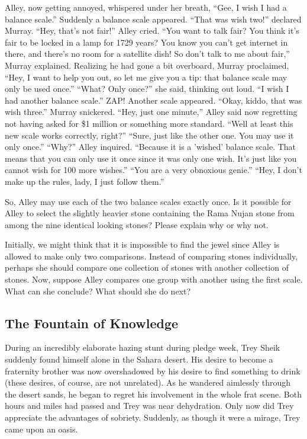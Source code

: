 Alley, now getting annoyed, whispered under her breath, ``Gee, I wish I had a balance scale.'' Suddenly a balance scale appeared. ``That was wish two!'' declared Murray. ``Hey, that's not fair!'' Alley cried. ``You want to talk fair? You think it's fair to be locked in a lamp for 1729 years? You know you can't get internet in there, and there's no room for a satellite dish! So don't talk to me about fair,'' Murray explained. Realizing he had gone a bit overboard, Murray proclaimed, ``Hey, I want to help you out, so let me give you a tip: that balance scale may only be used once.'' ``What? Only once?'' she said, thinking out loud. ``I wish I had another balance scale.'' ZAP! Another scale appeared. ``Okay, kiddo, that was wish three.'' Murray snickered. ``Hey, just one minute,'' Alley said now regretting not having asked for \$1 million or something more standard. ``Well at least this new scale works correctly, right?'' ``Sure, just like the other one. You may use it only once.'' ``Why?'' Alley inquired. ``Because it is a 'wished' balance scale. That means that you can only use it once since it was only one wish. It's just like you cannot wish for 100 more wishes.'' ``You are a very obnoxious genie.'' ``Hey, I don't make up the rules, lady, I just follow them.''

So, Alley may use each of the two balance scales exactly once. Is it possible for Alley to select the slightly heavier stone containing the Rama Nujan stone from among the nine identical looking stones? Please explain why or why not.

\ifnudges
\hrulefill

Initially, we might think that it is impossible to find the jewel since Alley is allowed to make only two comparisons.  Instead of comparing stones individually, perhaps she should compare one collection of stones with another collection of stones.  Now, suppose Alley compares one group with another using the first scale.  What can she conclude?  What should she do next?
\fi
\clearpage
\subsection{The Fountain of Knowledge}

During an incredibly elaborate hazing stunt during pledge week, Trey Sheik suddenly found himself alone in the Sahara desert. His desire to become a fraternity brother was now overshadowed by his desire to find something to drink (these desires, of course, are not unrelated). As he wandered aimlessly through the desert sands, he began to regret his involvement in the whole frat scene. Both hours and miles had passed and Trey was near dehydration. Only now did Trey appreciate the advantages of sobriety. Suddenly, as though it were a mirage, Trey came upon an oasis.

